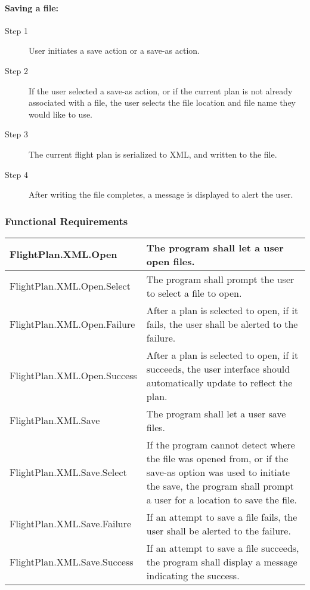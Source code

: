\documentclass[12pt, letterpaper]{article}
\begin{document}
            \paragraph{Saving a file:}
            \begin{description}
              \item[Step 1] User initiates a save action or a save-as action.
              \item[Step 2] If the user selected a save-as action, or if the current plan is not already associated with a file,
                the user selects the file location and file name they would like to use.
              \item[Step 3] The current flight plan is serialized to XML, and written to the file.
              \item[Step 4] After writing the file completes, a message is displayed to alert the user.
            \end{description}
          \subsubsection{Functional Requirements}
          \begin{tabularx}{\textwidth}{|l|X|} \hline
            FlightPlan.XML.Open & The program shall let a user open files. \\ \hline
            FlightPlan.XML.Open.Select & The program shall prompt the user to select a file to open. \\ \hline
            FlightPlan.XML.Open.Failure & After a plan is selected to open, if it fails, the user shall be alerted to the failure. \\ \hline
            FlightPlan.XML.Open.Success & After a plan is selected to open, if it succeeds, the user interface should automatically update to reflect the plan. \\ \hline
            FlightPlan.XML.Save & The program shall let a user save files. \\ \hline
            FlightPlan.XML.Save.Select & If the program cannot detect where the file was opened from,
                or if the save-as option was used to initiate the save, the program shall prompt a user for a location to save the file. \\ \hline
            FlightPlan.XML.Save.Failure & If an attempt to save a file fails, the user shall be alerted to the failure. \\ \hline
            FlightPlan.XML.Save.Success & If an attempt to save a file succeeds, the program shall display a message indicating the success. \\ \hline
          \end{tabularx}
\end{document}
